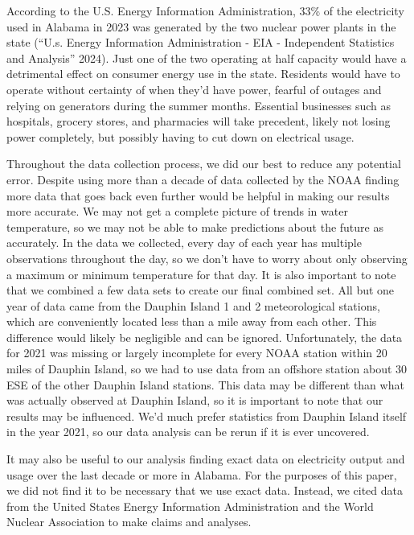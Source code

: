 \documentclass[
  letterpaper,
  DIV=11,
  numbers=noendperiod]{scrreprt}
\begin{document}
According to the U.S. Energy Information Administration, 33\% of the
electricity used in Alabama in 2023 was generated by the two nuclear
power plants in the state ({``U.s. Energy Information Administration -
EIA - Independent Statistics and Analysis''} 2024). Just one of the two
operating at half capacity would have a detrimental effect on consumer
energy use in the state. Residents would have to operate without
certainty of when they'd have power, fearful of outages and relying on
generators during the summer months. Essential businesses such as
hospitals, grocery stores, and pharmacies will take precedent, likely
not losing power completely, but possibly having to cut down on
electrical usage.

Throughout the data collection process, we did our best to reduce any
potential error. Despite using more than a decade of data collected by
the NOAA finding more data that goes back even further would be helpful
in making our results more accurate. We may not get a complete picture
of trends in water temperature, so we may not be able to make
predictions about the future as accurately. In the data we collected,
every day of each year has multiple observations throughout the day, so
we don't have to worry about only observing a maximum or minimum
temperature for that day. It is also important to note that we combined
a few data sets to create our final combined set. All but one year of
data came from the Dauphin Island 1 and 2 meteorological stations, which
are conveniently located less than a mile away from each other. This
difference would likely be negligible and can be ignored. Unfortunately,
the data for 2021 was missing or largely incomplete for every NOAA
station within 20 miles of Dauphin Island, so we had to use data from an
offshore station about 30 ESE of the other Dauphin Island stations. This
data may be different than what was actually observed at Dauphin Island,
so it is important to note that our results may be influenced. We'd much
prefer statistics from Dauphin Island itself in the year 2021, so our
data analysis can be rerun if it is ever uncovered.

It may also be useful to our analysis finding exact data on electricity
output and usage over the last decade or more in Alabama. For the
purposes of this paper, we did not find it to be necessary that we use
exact data. Instead, we cited data from the United States Energy
Information Administration and the World Nuclear Association to make
claims and analyses.
\end{document}

